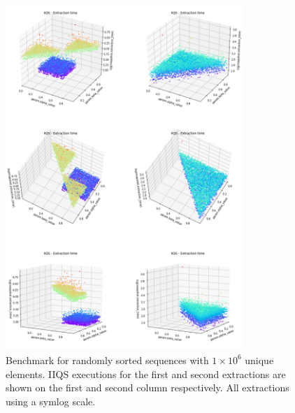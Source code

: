 \begin{figure}[!ht]
    \centering
    \includegraphics[width=0.8\textwidth]{./fragments/04_experimental_execution/images/04_alphabeta_singleclass.png}
    \caption{Benchmark for randomly sorted sequences with $1\times10^6$ unique elements. IIQS executions for the first and second extractions are shown on the first and second column respectively. All extractions using a symlog scale.}
    \label{FIG:05_ALPHABETA_RELATIONSHIP_RANDOM}
\end{figure}

